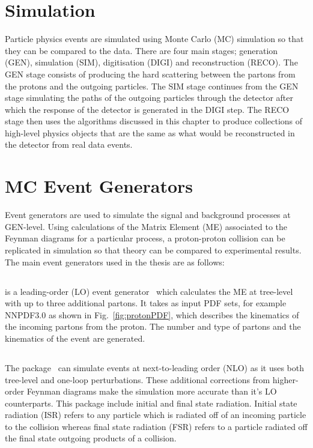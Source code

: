 \section{Simulation}
Particle physics events are simulated using Monte Carlo (MC) simulation so that they can be compared to the data. There are four main stages; generation (GEN), simulation (SIM), digitisation (DIGI) and reconstruction (RECO). The GEN stage consists of producing the hard scattering between the partons from the protons and the outgoing particles. The SIM stage continues from the GEN stage simulating the paths of the outgoing particles through the detector after which the response of the detector is generated in the DIGI step. The RECO stage then uses the algorithms discussed in this chapter to produce collections of high-level physics objects that are the same as what would be reconstructed in the detector from real data events.

\section{MC Event Generators}

Event generators are used to simulate the signal and background processes at GEN-level. Using calculations of the Matrix Element (ME) associated to the Feynman diagrams for a particular process, a proton-proton collision can be replicated in simulation so that theory can be compared to experimental results. The main event generators used in the thesis are as follows:

\subsection{\MADGRAPH}
\MADGRAPH is a leading-order (LO) event generator~\cite{Alwall2011} which calculates the ME at tree-level with up to three additional partons. It takes as input PDF sets, for example NNPDF3.0 as shown in Fig.~\ref{fig:protonPDF}, which describes the kinematics of the incoming partons from the proton. The number and type of partons and the kinematics of the event are generated.
\subsection{\aMCATNLO}
The \aMCATNLO package~\cite{Degrande:2014sta} can simulate events at next-to-leading order (NLO) as it uses both tree-level and one-loop perturbations. These additional corrections from higher-order Feynman diagrams make the simulation more accurate than it's LO counterparts. This package include initial and final state radiation. Initial state radiation (ISR) refers to any particle which is radiated off of an incoming particle to the collision whereas final state radiation (FSR) refers to a particle radiated off the final state outgoing products of a collision.\\
